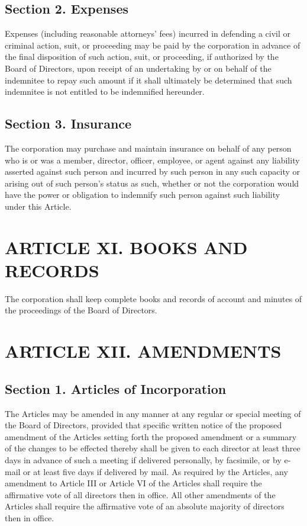 \documentclass[a4paper]{article}
\begin{document}
\subsection*{Section 2. Expenses}

Expenses (including reasonable attorneys' fees) incurred in defending a civil or criminal action, suit, or proceeding may be paid by the corporation in advance of the final disposition of such action, suit, or proceeding, if authorized by the Board of Directors, upon receipt of an undertaking by or on behalf of the indemnitee to repay such amount if it shall ultimately be determined that such indemnitee is not entitled to be indemnified hereunder.

\subsection*{Section 3. Insurance}

The corporation may purchase and maintain insurance on behalf of any person who is or was a member, director, officer, employee, or agent against any liability asserted against such person and incurred by such person in any such capacity or arising out of such person's status as such, whether or not the corporation would have the power or obligation to indemnify such person against such liability under this Article.

\section*{ARTICLE XI. BOOKS AND RECORDS}

The corporation shall keep complete books and records of account and minutes of the proceedings of the Board of Directors.

\section*{ARTICLE XII. AMENDMENTS}


\subsection*{Section 1. Articles of Incorporation}

The Articles may be amended in any manner at any regular or special meeting of the Board of Directors, provided that specific written notice of the proposed amendment of the Articles setting forth the proposed amendment or a summary of the changes to be effected thereby shall be given to each director at least three days in advance of such a meeting if delivered personally, by facsimile, or by e-mail or at least five days if delivered by mail. As required by the Articles, any amendment to Article III or Article VI of the Articles shall require the affirmative vote of all directors then in office. All other amendments of the Articles shall require the affirmative vote of an absolute majority of directors then in office.
\end{document}
